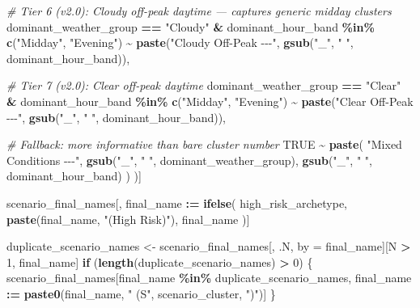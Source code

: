 \documentclass[
]{article}
\newenvironment{Shaded}{\begin{snugshade}}{\end{snugshade}}
\newcommand{\CommentTok}[1]{\textcolor[rgb]{0.56,0.35,0.01}{\textit{#1}}}
\newcommand{\ConstantTok}[1]{\textcolor[rgb]{0.56,0.35,0.01}{#1}}
\newcommand{\ControlFlowTok}[1]{\textcolor[rgb]{0.13,0.29,0.53}{\textbf{#1}}}
\newcommand{\DecValTok}[1]{\textcolor[rgb]{0.00,0.00,0.81}{#1}}
\newcommand{\FunctionTok}[1]{\textcolor[rgb]{0.13,0.29,0.53}{\textbf{#1}}}
\newcommand{\NormalTok}[1]{#1}
\newcommand{\OtherTok}[1]{\textcolor[rgb]{0.56,0.35,0.01}{#1}}
\newcommand{\SpecialCharTok}[1]{\textcolor[rgb]{0.81,0.36,0.00}{\textbf{#1}}}
\newcommand{\StringTok}[1]{\textcolor[rgb]{0.31,0.60,0.02}{#1}}
\begin{document}
\begin{Shaded}
\begin{Highlighting}[]
  \CommentTok{\# Tier 6 (v2.0): Cloudy off{-}peak daytime — captures generic midday clusters}
\NormalTok{  dominant\_weather\_group }\SpecialCharTok{==} \StringTok{"Cloudy"} \SpecialCharTok{\&}
\NormalTok{    dominant\_hour\_band }\SpecialCharTok{\%in\%} \FunctionTok{c}\NormalTok{(}\StringTok{"Midday"}\NormalTok{, }\StringTok{"Evening"}\NormalTok{) }\SpecialCharTok{\textasciitilde{}}
    \FunctionTok{paste}\NormalTok{(}\StringTok{"Cloudy Off{-}Peak {-}{-}{-}"}\NormalTok{, }\FunctionTok{gsub}\NormalTok{(}\StringTok{"\_"}\NormalTok{, }\StringTok{" "}\NormalTok{, dominant\_hour\_band)),}

  \CommentTok{\# Tier 7 (v2.0): Clear off{-}peak daytime}
\NormalTok{  dominant\_weather\_group }\SpecialCharTok{==} \StringTok{"Clear"} \SpecialCharTok{\&}
\NormalTok{    dominant\_hour\_band }\SpecialCharTok{\%in\%} \FunctionTok{c}\NormalTok{(}\StringTok{"Midday"}\NormalTok{, }\StringTok{"Evening"}\NormalTok{) }\SpecialCharTok{\textasciitilde{}}
    \FunctionTok{paste}\NormalTok{(}\StringTok{"Clear Off{-}Peak {-}{-}{-}"}\NormalTok{, }\FunctionTok{gsub}\NormalTok{(}\StringTok{"\_"}\NormalTok{, }\StringTok{" "}\NormalTok{, dominant\_hour\_band)),}

  \CommentTok{\# Fallback: more informative than bare cluster number}
  \ConstantTok{TRUE} \SpecialCharTok{\textasciitilde{}}
    \FunctionTok{paste}\NormalTok{(}
      \StringTok{"Mixed Conditions {-}{-}{-}"}\NormalTok{,}
      \FunctionTok{gsub}\NormalTok{(}\StringTok{"\_"}\NormalTok{, }\StringTok{" "}\NormalTok{, dominant\_weather\_group),}
      \FunctionTok{gsub}\NormalTok{(}\StringTok{"\_"}\NormalTok{, }\StringTok{" "}\NormalTok{, dominant\_hour\_band)}
\NormalTok{    )}
\NormalTok{)]}

\NormalTok{scenario\_final\_names[, final\_name }\SpecialCharTok{:=} \FunctionTok{ifelse}\NormalTok{(}
\NormalTok{  high\_risk\_archetype,}
  \FunctionTok{paste}\NormalTok{(final\_name, }\StringTok{"(High Risk)"}\NormalTok{),}
\NormalTok{  final\_name}
\NormalTok{)]}

\NormalTok{duplicate\_scenario\_names }\OtherTok{\textless{}{-}}\NormalTok{ scenario\_final\_names[, .N, by }\OtherTok{=}\NormalTok{ final\_name][N }\SpecialCharTok{\textgreater{}} \DecValTok{1}\NormalTok{, final\_name]}
\ControlFlowTok{if}\NormalTok{ (}\FunctionTok{length}\NormalTok{(duplicate\_scenario\_names) }\SpecialCharTok{\textgreater{}} \DecValTok{0}\NormalTok{) \{}
\NormalTok{  scenario\_final\_names[final\_name }\SpecialCharTok{\%in\%}\NormalTok{ duplicate\_scenario\_names, final\_name }\SpecialCharTok{:=} \FunctionTok{paste0}\NormalTok{(final\_name, }\StringTok{" (S"}\NormalTok{, scenario\_cluster, }\StringTok{")"}\NormalTok{)]}
\NormalTok{\}}


\end{Highlighting}
\end{Shaded}
\end{document}
